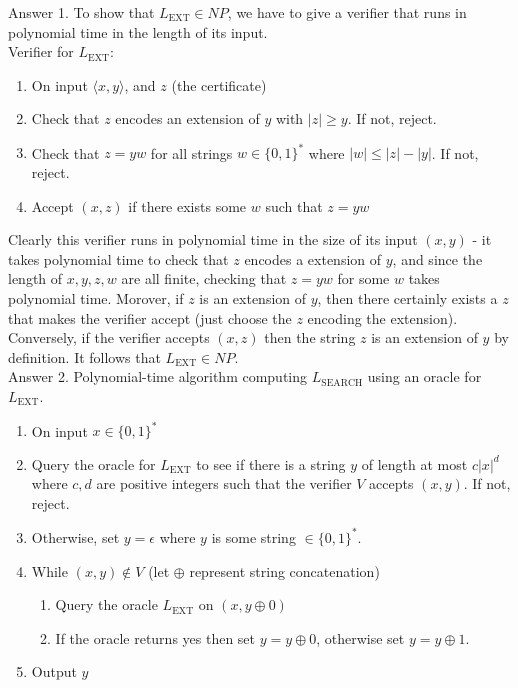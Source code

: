 \documentclass{csc_assignment}
\begin{document}
\begin{description}
  Answer 1. To show that $L_{\text{EXT}} \in NP$, we have to give a verifier that runs in polynomial time in the length of its input. \\ Verifier for $L_{\text{EXT}}$: \begin{enumerate}
  \item On input $\langle x, y \rangle$, and $z$ (the certificate)
  \item Check that $z$ encodes an extension of $y$ with $|z| \geq y$. If not, reject.
  \item Check that $z = yw$ for all strings $w \in \{0, 1\}^{*}$ where $|w| \leq |z| - |y|$. If not, reject.
  \item Accept $(x, z)$ if there exists some $w$ such that $z = yw$
  \end{enumerate}
  Clearly this verifier runs in polynomial time in the size of its input $(x, y)$ - it takes polynomial time to check that $z$ encodes a extension of $y$, and since the length of $x, y, z, w$ are all finite, checking that $z = yw$ for some $w$ takes polynomial time. Morover, if $z$ is an extension of $y$, then there certainly exists a $z$ that makes the verifier accept (just choose the $z$ encoding the extension). Conversely, if the verifier accepts $(x, z)$ then the string $z$ is an extension of $y$ by definition. It follows that $L_{\text{EXT}} \in NP$. \\[5pt]
  Answer 2. Polynomial-time algorithm computing $L_{\text{SEARCH}}$ using an oracle for $L_{\text{EXT}}$. \begin{enumerate}
  \item On input $x \in \{0, 1\}^{*}$
  \item Query the oracle for $L_{\text{EXT}}$ to see if there is a string $y$ of length at most $c|x|^{d}$ where $c, d$ are positive integers such that the verifier $V$ accepts $(x, y)$. If not, reject.
  \item Otherwise, set $y = \epsilon$ where $y$ is some string $\in \{0, 1\}^{*}$.
  \item While $(x, y) \notin V$ (let $\oplus$ represent string concatenation) 
  \begin{enumerate} 
  \item Query the oracle $L_{\text{EXT}}$ on $(x, y \oplus 0)$
  \item If the oracle returns yes then set $y = y \oplus 0$, otherwise set $y = y \oplus 1$.
  \end{enumerate}
  \item Output $y$
  \end{enumerate}

\end{description}
\end{document}
